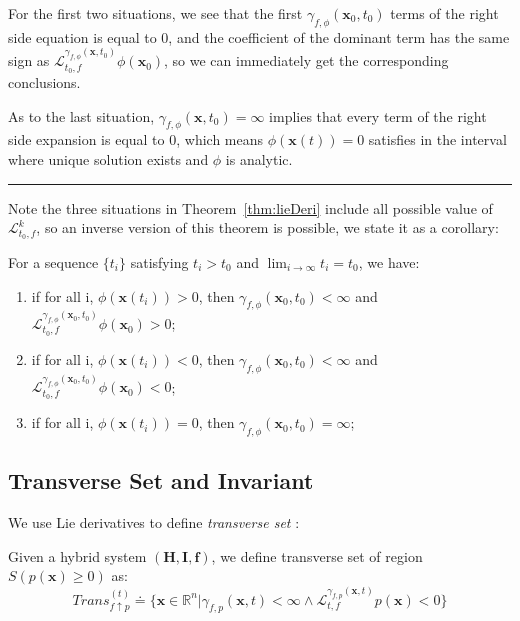 \documentclass{jssc}
\newcommand{\rulex}{\hfill\rule{1mm}{3mm}}
\begin{document}
For the first two situations, we see that the first $\gamma_{f, \phi}(\boldsymbol{x}_0, t_0)$ terms of the right side equation is equal to 0, and the coefficient of the dominant term has the same sign as $\mathcal{L}_{t_0, f}^{\gamma_{f, \phi}(\boldsymbol{x}, t_0)} \phi (\boldsymbol{x}_0)$, so we can immediately get the corresponding conclusions. 

As to the last situation, $\gamma_{f, \phi}(\boldsymbol{x}, t_0) = \infty$ implies that every term of the right side expansion is equal to 0, which means $\phi (\boldsymbol{x}(t)) =0$ satisfies in the interval where unique solution exists and $\phi$ is analytic.
\rulex

Note the three situations in Theorem~\ref{thm:lieDeri} include all possible value of $\mathcal{L}_{t_0, f}^{k}$, so an inverse version of this theorem is possible, we state it as a corollary: 

\begin{corollary}
\label{cor:lieDeri}
For a sequence $\{ t_i \}$  satisfying $t_i > t_0$ and $\lim_{i \to \infty} t_i = t_0$, we have: 
\begin{enumerate}
	\item if for all i, $\phi(\boldsymbol{x}(t_i)) > 0$, then $\gamma_{f, \phi}(\boldsymbol{x}_0, t_0) < \infty$ and $\mathcal{L}_{t_0, f}^{\gamma_{f, \phi}(\boldsymbol{x}_0, t_0)} \phi (\boldsymbol{x}_0) > 0$; 
	\item if for all i, $\phi(\boldsymbol{x}(t_i)) < 0$, then $\gamma_{f, \phi}(\boldsymbol{x}_0, t_0) < \infty$ and $\mathcal{L}_{t_0, f}^{\gamma_{f, \phi}(\boldsymbol{x}_0, t_0)} \phi (\boldsymbol{x}_0) < 0$;
	\item if for all i, $\phi(\boldsymbol{x}(t_i)) = 0$, then $\gamma_{f, \phi}(\boldsymbol{x}_0, t_0) = \infty$; 
\end{enumerate}
\end{corollary}

\subsection{Transverse Set and Invariant}
We use Lie derivatives to define \emph{transverse set} :

\begin{definition}
\label{def:trans}
	Given a hybrid system $(\boldsymbol{H}, \boldsymbol{I}, \boldsymbol{f})$, we define transverse set of region $S(p(\boldsymbol{x}) \geq 0)$ as: 
	\begin{equation*}
		Trans_{f \uparrow p}^{(t)} \doteq \{\boldsymbol{x} \in \mathbb{R}^n | \gamma_{f, p}(\boldsymbol{x}, t) < \infty \wedge \mathcal{L}_{t, f}^{\gamma_{f, p}(\boldsymbol{x}, t)} p(\boldsymbol{x}) < 0 \}
	\end{equation*}
\end{definition}
\end{document}
